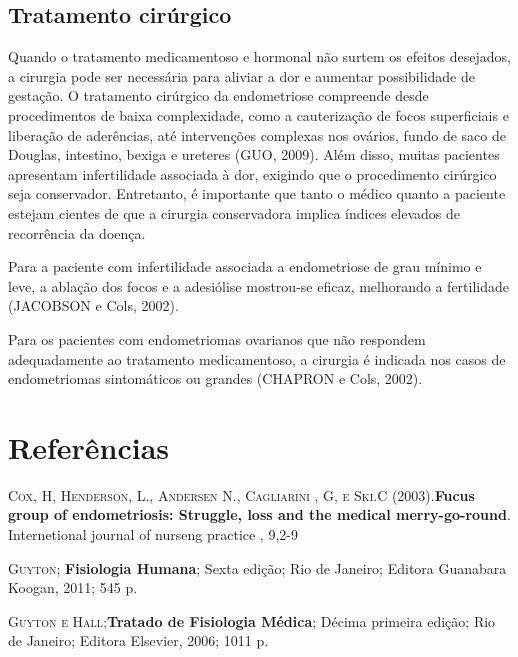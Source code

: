 \documentclass[12pt]{article} %
\begin{document}
\subsection{Tratamento cirúrgico}

Quando o tratamento medicamentoso e hormonal não surtem os efeitos
desejados, a cirurgia pode ser necessária para aliviar a dor e
aumentar possibilidade de gestação.  O tratamento cirúrgico da
endometriose compreende desde procedimentos de baixa complexidade,
como a cauterização de focos superficiais e liberação de aderências, até
intervenções complexas nos ovários, fundo de saco de Douglas,
intestino, bexiga e ureteres (GUO, 2009). Além disso, muitas pacientes
apresentam infertilidade associada à dor, exigindo que o procedimento
cirúrgico seja conservador. Entretanto, é importante que tanto o
médico quanto a paciente estejam cientes de que a cirurgia
conservadora implica índices elevados de recorrência da doença. %

Para a paciente com infertilidade associada a endometriose de grau
mínimo e leve, a ablação dos focos e a adesiólise mostrou-se eficaz,
melhorando a fertilidade (JACOBSON e Cols, 2002).

Para os pacientes com endometriomas ovarianos que não respondem
adequadamente ao tratamento medicamentoso, a cirurgia é indicada nos
casos de endometriomas sintomáticos ou grandes (CHAPRON e Cols, 2002).


\section{Referências} 
\setlength{\parindent}{0pt}

\textsc{Cox, H, Henderson, L., Andersen  N., Cagliarini , G, e Ski.C}
(2003).\textbf{Fucus group of endometriosis: Struggle, loss and the medical merry-go-round}. Internetional journal of nurseng practice , 9,2-9

\vspace{0,5cm}

\textsc{Guyton}; \textbf{ Fisiologia Humana}; Sexta edição; Rio de Janeiro; Editora Guanabara Koogan, 2011; 545 p.

\vspace{0,5cm}

\textsc{Guyton e Hall};\textbf{Tratado de Fisiologia Médica}; Décima primeira edição; Rio de Janeiro; Editora Elsevier, 2006; 1011 p.

\vspace{0,5cm}
\end{document}

